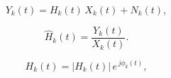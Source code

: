 


\begin{equation}\label{eq:ofdm-rx}
  Y_k(t) = H_k(t)\,X_k(t) + N_k(t),
\end{equation}

\begin{equation}\label{eq:csi-estimate}
  \hat{H}_k(t) = \frac{Y_k(t)}{X_k(t)}.
\end{equation}

\begin{equation}\label{eq:csi-polar}
  H_k(t) = \lvert H_k(t)\rvert\, e^{\,j\phi_k(t)},
\end{equation}


